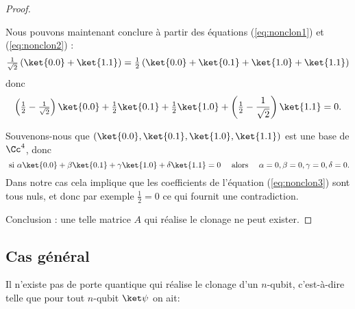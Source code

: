 \documentclass[11pt,class=report,crop=false]{standalone}
\begin{document}
\begin{proof}
\begin{itemize}
\end{itemize}

Nous pouvons maintenant conclure à partir des équations (\ref{eq:nonclon1}) et (\ref{eq:nonclon2}) :
$$\tfrac1{\sqrt2} \left(\ket{0.0} + \ket{1.1} \right) 
= \tfrac12 \left( \ket{0.0} + \ket{0.1} + \ket{1.0} + \ket{1.1} \right)$$
donc
\begin{equation}
\label{eq:nonclon3}
\left(\tfrac12-\tfrac1{\sqrt2}\right) \ket{0.0} + \tfrac12\ket{0.1} + \tfrac12\ket{1.0} + \left(\tfrac12-\frac1{\sqrt2}\right)\ket{1.1} = 0.
\end{equation}

Souvenons-nous que $(\ket{0.0},\ket{0.1},\ket{1.0},\ket{1.1})$ est une base de $\Cc^4$,
donc
$$\text{ si } \alpha\ket{0.0} + \beta \ket{0.1} +\gamma\ket{1.0} +\delta\ket{1.1}=0
\quad\text{ alors }\quad \alpha=0, \beta=0, \gamma= 0, \delta=0.$$
Dans notre cas cela implique que les coefficients de l'équation (\ref{eq:nonclon3}) sont tous nuls, et donc par exemple $\frac12=0$ ce qui fournit une contradiction.

Conclusion : une telle matrice $A$ qui réalise le clonage ne peut exister.
\end{proof}
\subsection{Cas général}


\begin{theoreme}
Il n'existe pas de porte quantique qui réalise le clonage d'un $n$-qubit, c'est-à-dire telle que pour tout $n$-qubit $\ket\psi$ on ait:
\end{theoreme}

\end{document}
